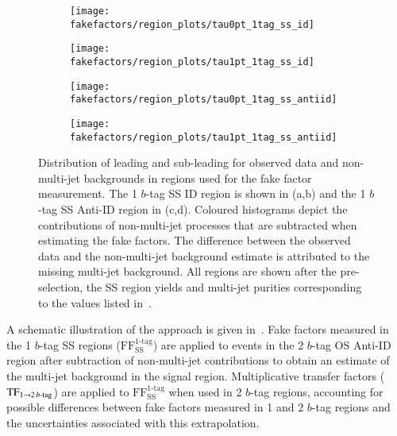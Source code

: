 \begin{figure}[htbp]
  \centering

  \begin{subfigure}{0.49\textwidth}
    \texttt{[image: fakefactors/region\_plots/tau0pt\_1tag\_ss\_id]}
  \end{subfigure}
  \begin{subfigure}{0.49\textwidth}
    \texttt{[image: fakefactors/region\_plots/tau1pt\_1tag\_ss\_id]}
  \end{subfigure}

  \begin{subfigure}{0.49\textwidth}
    \texttt{[image: fakefactors/region\_plots/tau0pt\_1tag\_ss\_antiid]}
  \end{subfigure}
  \begin{subfigure}{0.49\textwidth}
    \texttt{[image: fakefactors/region\_plots/tau1pt\_1tag\_ss\_antiid]}
  \end{subfigure}

  \caption{Distribution of leading and sub-leading \tauhadvis \pT for
    observed data and non-multi-jet backgrounds in regions used for
    the fake factor measurement. The 1 $b$-tag SS ID region is shown
    in (a,b) and the 1 $b$-tag SS Anti-ID region in (c,d). Coloured
    histograms depict the contributions of non-multi-jet processes
    that are subtracted when estimating the fake factors. The
    difference between the observed data and the non-multi-jet
    background estimate is attributed to the missing multi-jet
    background. All regions are shown after the pre-selection, the SS
    region yields and multi-jet purities corresponding to the values
    listed in~.}%
  \label{fig:mjfakes_1tag_ss_plots}
\end{figure}

A schematic illustration of the approach is given
in~. Fake factors measured in the 1
$b$-tag SS regions ($\text{FF}_\text{SS}^\text{1-tag}$) are applied to
events in the 2 $b$-tag OS Anti-ID region after subtraction of
non-multi-jet contributions to obtain an estimate of the multi-jet
background in the signal region. Multiplicative transfer factors
($\text{TF}_{1 \rightarrow 2\,b\text{-tag}}$) are applied to
$\text{FF}_\text{SS}^\text{1-tag}$ when used in 2 $b$-tag regions,
accounting for possible differences between fake factors measured in 1
and 2 $b$-tag regions and the uncertainties associated with this
extrapolation.

